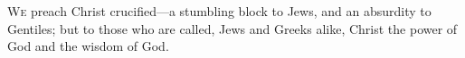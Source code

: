 \lettrine[lines=3,loversize=0.15]{W}{e} preach Christ crucified—a stumbling block to Jews, and an absurdity to Gentiles; but to those who are called, Jews and Greeks alike, Christ the power of God and the wisdom of God.
